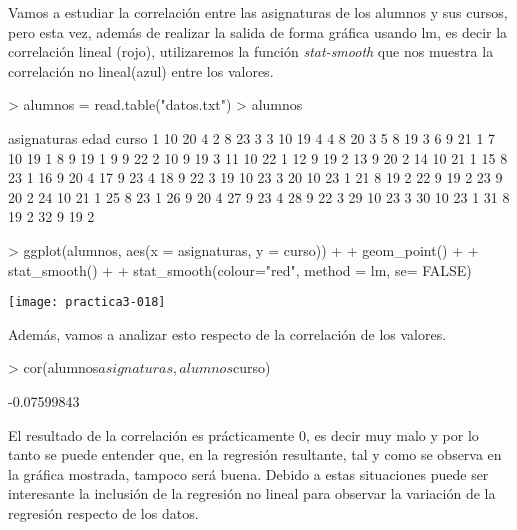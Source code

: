 \documentclass[a4paper]{article}
\begin{document}
Vamos a estudiar la correlación entre las asignaturas de los alumnos y sus cursos, pero esta vez, además de realizar la salida de forma gráfica usando lm, es decir la correlación lineal (rojo), utilizaremos la función \textit{stat-smooth} que nos muestra la correlación no lineal(azul) entre los valores.
\begin{Schunk}
\begin{Sinput}
> alumnos = read.table("datos.txt")
> alumnos
\end{Sinput}
\begin{Soutput}
   asignaturas edad curso
1           10   20     4
2            8   23     3
3           10   19     4
4            8   20     3
5            8   19     3
6            9   21     1
7           10   19     1
8            9   19     1
9            9   22     2
10           9   19     3
11          10   22     1
12           9   19     2
13           9   20     2
14          10   21     1
15           8   23     1
16           9   20     4
17           9   23     4
18           9   22     3
19          10   23     3
20          10   23     1
21           8   19     2
22           9   19     2
23           9   20     2
24          10   21     1
25           8   23     1
26           9   20     4
27           9   23     4
28           9   22     3
29          10   23     3
30          10   23     1
31           8   19     2
32           9   19     2
\end{Soutput}
\begin{Sinput}
> ggplot(alumnos, aes(x = asignaturas, y = curso)) + 
+   geom_point() +  
+   stat_smooth() +
+   stat_smooth(colour="red", method = lm, se= FALSE)
\end{Sinput}
\end{Schunk}
\texttt{[image: practica3-018]}

Además, vamos a analizar esto respecto de la correlación de los valores.
\begin{Schunk}
\begin{Sinput}
> cor(alumnos$asignaturas, alumnos$curso)
\end{Sinput}
\begin{Soutput}
[1] -0.07599843
\end{Soutput}
\end{Schunk}

El resultado de la correlación es prácticamente 0, es decir muy malo y por lo tanto se puede entender que, en la regresión resultante, tal y como se observa en la gráfica mostrada, tampoco será buena. Debido a estas situaciones puede ser interesante la inclusión de la regresión no lineal para observar la variación de la regresión respecto de los datos.
\end{document}

